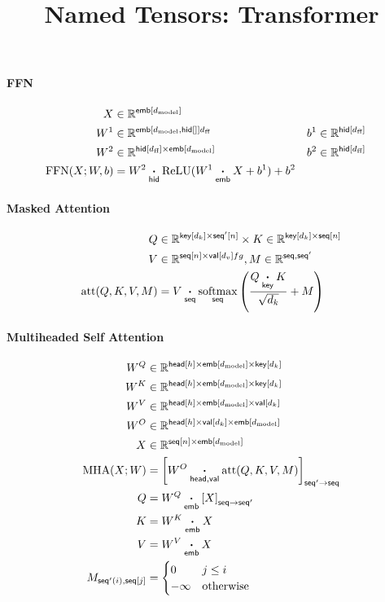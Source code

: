 \documentclass{article}
\title{Named Tensors: Transformer}
\date{}
\newcommand{\reals}[0]{\mathbb{R}}
\newcommand{\dmodel}{d_{\text{model}}}
\newcommand{\dff}{d_{\text{ff}}}
\begin{document}
\maketitle


\paragraph{FFN}
\begin{align*}
X &\in \reals^{\nset{emb}{\dmodel}} \\
W^1 &\in \reals^{\nset{emb}{\dmodel, \nset{hid}}{\dff}} & 
b^1 &\in \reals^{\nset{hid}{\dff}} \\
W^2 & \in \reals^{\nset{hid}{\dff} \times \nset{emb}{\dmodel}} & b^2 &\in \reals^{\nset{hid}{\dff}} \\
\text{FFN}(X; W, b) &=  W^2 \ndot{hid} \text{ReLU}(W^1 \ndot{emb} X + b^1) + b^2
\end{align*}

\paragraph{Masked Attention}
\begin{align*} 
Q &\in \reals^{\nset{key}{d_k} \times \nset{seq'}{n}} \times K \in \reals^{\nset{key}{d_k} \times \nset{seq}{n}}\\
V &\in \reals^{\nset{seq}{n} \times \nset{val}{d_v}fg
},
M \in \reals^{\name{seq}, \name{seq'}}\\
\text{att}(Q, K, V, M) &=  V \ndot{seq} \nfun{seq}{softmax} \left( \frac{\displaystyle Q \ndot{key} K }{\sqrt{d_k}} + M \right) 
\end{align*}

\paragraph{Multiheaded Self Attention}
\begin{align*}
  W^Q &\in \mathbb{R}^{\nset{head}{h} \times \nset{emb}{\dmodel} \times \nset{key}{d_k}} \\
  W^K &\in \mathbb{R}^{\nset{head}{h} \times \nset{emb}{\dmodel} \times \nset{key}{d_k}} \\
  W^V &\in \mathbb{R}^{\nset{head}{h} \times \nset{emb}{\dmodel} \times \nset{val}{d_k}} \\
  W^O &\in \mathbb{R}^{\nset{head}{h} \times \nset{val}{d_k} \times \nset{emb}{\dmodel}} \\
  X &\in \mathbb{R}^{\nset{seq}{n} \times \nset{emb}{\dmodel}} \\
  \text{MHA}(X; W) &= \nmov{seq'}{seq}{W^O \ndot{head,val} \text{att}(Q, K, V, M)} \\
  Q &= W^Q \ndot{emb} \nmov{seq}{seq'}{X} \\
  K &= W^K \ndot{emb} X \\
  V &= W^V \ndot{emb} X \\
  M_{\nidx{seq'}{i}, \nset{seq}{j}} &= \begin{cases} 0 & j\leq i \\ -\infty & \text{otherwise} \end{cases}   
\end{align*}
\end{document}
